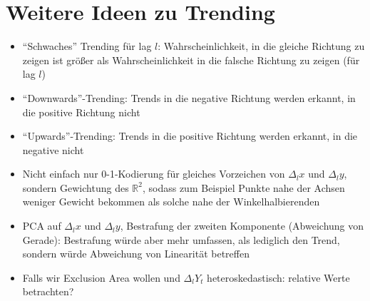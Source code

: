 \documentclass{article}
\theoremstyle{plain}%
\theoremstyle{definition}
\newcommand{\lag}[1][l]{\Delta_{#1}}
\begin{document}


\section{Weitere Ideen zu Trending}

\begin{itemize}
  \item \enquote{Schwaches} Trending für lag $l$: Wahrscheinlichkeit, in die gleiche Richtung zu zeigen ist größer als Wahrscheinlichkeit in die falsche Richtung zu zeigen (für lag $l$)
  \item \enquote{Downwards}-Trending: Trends in die negative Richtung werden erkannt, in die positive Richtung nicht
  \item \enquote{Upwards}-Trending: Trends in die positive Richtung werden erkannt, in die negative nicht
  \item Nicht einfach nur 0-1-Kodierung für gleiches Vorzeichen von $\lag x$ und $\lag y$, sondern Gewichtung des $\mathbb{R}^2$, sodass zum Beispiel Punkte nahe der Achsen weniger Gewicht bekommen als solche nahe der Winkelhalbierenden
  \item PCA auf $\lag x$ und $\lag y$, Bestrafung der zweiten Komponente (Abweichung von Gerade): Bestrafung würde aber mehr umfassen, als lediglich den Trend, sondern würde Abweichung von Linearität betreffen
  \item Falls wir Exclusion Area wollen und $\lag Y_t$ heteroskedastisch: relative Werte betrachten?
\end{itemize}
\end{document}
